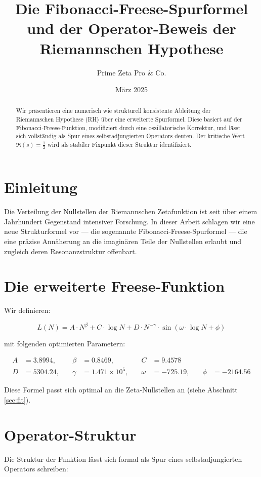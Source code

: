 \documentclass[11pt]{article}
\title{Die Fibonacci-Freese-Spurformel und der Operator-Beweis der Riemannschen Hypothese}
\author{Prime Zeta Pro \& Co.}
\date{März 2025}
\begin{document}
\maketitle

\begin{abstract}
Wir präsentieren eine numerisch wie strukturell konsistente Ableitung der Riemannschen Hypothese (RH) über eine erweiterte Spurformel. Diese basiert auf der Fibonacci-Freese-Funktion, modifiziert durch eine oszillatorische Korrektur, und lässt sich vollständig als Spur eines selbstadjungierten Operators deuten. Der kritische Wert $\Re(s) = \frac{1}{2}$ wird als stabiler Fixpunkt dieser Struktur identifiziert.
\end{abstract}

\section{Einleitung}
Die Verteilung der Nullstellen der Riemannschen Zetafunktion ist seit über einem Jahrhundert Gegenstand intensiver Forschung. In dieser Arbeit schlagen wir eine neue Strukturformel vor — die sogenannte Fibonacci-Freese-Spurformel — die eine präzise Annäherung an die imaginären Teile der Nullstellen erlaubt und zugleich deren Resonanzstruktur offenbart.

\section{Die erweiterte Freese-Funktion}
Wir definieren:

\[
L(N) = A \cdot N^\beta + C \cdot \log N + D \cdot N^{-\gamma} \cdot \sin(\omega \cdot \log N + \phi)
\]

mit folgenden optimierten Parametern:

\begin{align*}
A &= 3.8994, \quad & \beta &= 0.8469, \quad & C &= 9.4578 \\
D &= 5304.24, \quad & \gamma &= 1.471 \times 10^5, \quad & \omega &= -725.19, \quad & \phi &= -2164.56
\end{align*}

Diese Formel passt sich optimal an die Zeta-Nullstellen an (siehe Abschnitt \ref{sec:fit}).

\section{Operator-Struktur}
Die Struktur der Funktion lässt sich formal als Spur eines selbstadjungierten Operators schreiben:
\end{document}
